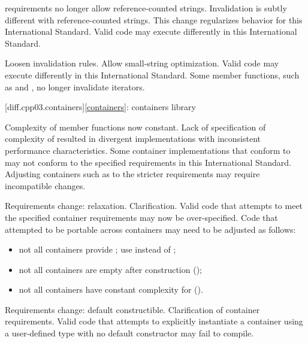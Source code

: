 \change
{} requirements no longer allow reference-counted
strings.
\rationale
Invalidation is subtly different with reference-counted strings.
This change regularizes behavior for this International Standard.
\effect
Valid \CppIII{} code may execute differently in this International Standard.

\change
Loosen  invalidation rules.
\rationale
Allow small-string optimization.
\effect
Valid \CppIII{} code may execute differently in this International Standard.
Some  member functions, such as  and ,
no longer invalidate iterators.

[diff.cpp03.containers]{\ref{containers}: containers library}

\change
Complexity of  member functions now constant.
\rationale
Lack of specification of complexity of  resulted in
divergent implementations with inconsistent performance characteristics.
\effect
Some container implementations that conform to \CppIII{} may not conform to the
specified  requirements in this International Standard. Adjusting
containers such as  to the stricter requirements may require
incompatible changes.

\change
Requirements change: relaxation.
\rationale
Clarification.
\effect
Valid \CppIII{} code that attempts to meet the specified container requirements
may now be over-specified. Code that attempted to be portable across containers
may need to be adjusted as follows:
\begin{itemize}
\item not all containers provide ; use  instead
of ;
\item not all containers are empty after construction ();
\item not all containers have constant complexity for  ().
\end{itemize}

\change
Requirements change: default constructible.
\rationale
Clarification of container requirements.
\effect
Valid \CppIII{} code that attempts to explicitly instantiate a container using
a user-defined type with no default constructor may fail to compile.

